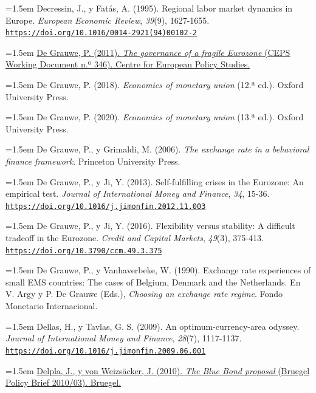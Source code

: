 \documentclass[10pt,a4paper]{article}
\begin{document}
\noindent\hangindent=1.5em Decressin, J., y Fatás, A. (1995). Regional labor market dynamics in Europe. \textit{European Economic Review}, \textit{39}(9), 1627-1655. \href{https://doi.org/10.1016/0014-2921(94)00102-2}{\nolinkurl{https://doi.org/10.1016/0014-2921(94)00102-2}}

\noindent\hangindent=1.5em \href{https://www.ceps.eu/wp-content/uploads/2011/05/WD\%20346\%20De\%20Grauwe\%20on\%20Eurozone\%20Governance.pdf}{De Grauwe, P. (2011). \textit{The governance of a fragile Eurozone} (CEPS Working Document n.º 346). Centre for European Policy Studies.}

\noindent\hangindent=1.5em De Grauwe, P. (2018). \textit{Economics of monetary union} (12.ª ed.). Oxford University Press.

\noindent\hangindent=1.5em De Grauwe, P. (2020). \textit{Economics of monetary union} (13.ª ed.). Oxford University Press.

\noindent\hangindent=1.5em De Grauwe, P., y Grimaldi, M. (2006). \textit{The exchange rate in a behavioral finance framework}. Princeton University Press.

\noindent\hangindent=1.5em De Grauwe, P., y Ji, Y. (2013). Self-fulfilling crises in the Eurozone: An empirical test. \textit{Journal of International Money and Finance}, \textit{34}, 15-36. \href{https://doi.org/10.1016/j.jimonfin.2012.11.003}{\nolinkurl{https://doi.org/10.1016/j.jimonfin.2012.11.003}}

\noindent\hangindent=1.5em De Grauwe, P., y Ji, Y. (2016). Flexibility versus stability: A difficult tradeoff in the Eurozone. \textit{Credit and Capital Markets}, \textit{49}(3), 375-413. \href{https://doi.org/10.3790/ccm.49.3.375}{\nolinkurl{https://doi.org/10.3790/ccm.49.3.375}}

\noindent\hangindent=1.5em De Grauwe, P., y Vanhaverbeke, W. (1990). Exchange rate experiences of small EMS countries: The cases of Belgium, Denmark and the Netherlands. En V. Argy y P. De Grauwe (Eds.), \textit{Choosing an exchange rate regime}. Fondo Monetario Internacional.

\noindent\hangindent=1.5em Dellas, H., y Tavlas, G. S. (2009). An optimum-currency-area odyssey. \textit{Journal of International Money and Finance}, \textit{28}(7), 1117-1137. \href{https://doi.org/10.1016/j.jimonfin.2009.06.001}{\nolinkurl{https://doi.org/10.1016/j.jimonfin.2009.06.001}}

\noindent\hangindent=1.5em \href{https://www.bruegel.org/policy-brief/blue-bond-proposal}{Delpla, J., y von Weizsäcker, J. (2010). \textit{The Blue Bond proposal} (Bruegel Policy Brief 2010/03). Bruegel.}
\end{document}
